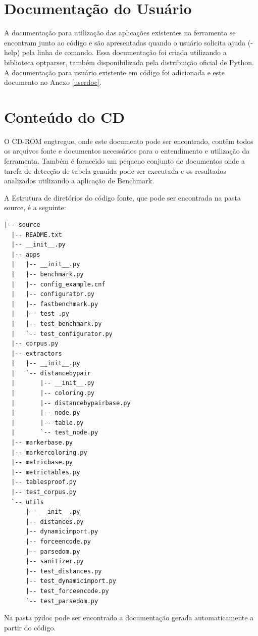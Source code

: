 \documentclass[12pt, a4paper]{article}
\begin{document}
\section{Documentação do Usuário}

A documentação para utilização das aplicações existentes na ferramenta
se encontram junto ao código e são apresentadas quando o usuário
solicita ajuda (-help) pela linha de comando. Essa documentação foi
criada utilizando a biblioteca optparser, também disponibilizada pela
distribuição oficial de Python. A documentação para usuário existente em
código foi adicionada e este documento no Anexo \ref{userdoc}.


\section{Conteúdo do CD}

O CD-ROM engtregue, onde este documento pode ser encontrado, contêm
todos os arquivos fonte e documentos necessários para o entendimento e
utilização da ferramenta. Também é fornecido um pequeno conjunto de
documentos onde a tarefa de detecção de tabela genuida pode ser
executada e os resultados analizados utilizando a aplicação de Benchmark.

A Estrutura de diretórios do código fonte, que pode ser encontrada na
pasta source, é a seguinte:

\begin{verbatim}
|-- source
  |-- README.txt 
  |-- __init__.py
  |-- apps
  |   |-- __init__.py
  |   |-- benchmark.py
  |   |-- config_example.cnf
  |   |-- configurator.py
  |   |-- fastbenchmark.py
  |   |-- test_.py
  |   |-- test_benchmark.py
  |   `-- test_configurator.py
  |-- corpus.py
  |-- extractors
  |   |-- __init__.py
  |   `-- distancebypair
  |       |-- __init__.py
  |       |-- coloring.py
  |       |-- distancebypairbase.py
  |       |-- node.py
  |       |-- table.py
  |       `-- test_node.py
  |-- markerbase.py
  |-- markercoloring.py
  |-- metricbase.py
  |-- metrictables.py
  |-- tablesproof.py
  |-- test_corpus.py
  `-- utils
      |-- __init__.py
      |-- distances.py
      |-- dynamicimport.py
      |-- forceencode.py
      |-- parsedom.py
      |-- sanitizer.py
      |-- test_distances.py
      |-- test_dynamicimport.py
      |-- test_forceencode.py
      `-- test_parsedom.py
\end{verbatim}

Na pasta pydoc pode ser encontrado a documentação gerada automaticamente
a partir do código.
\end{document}
